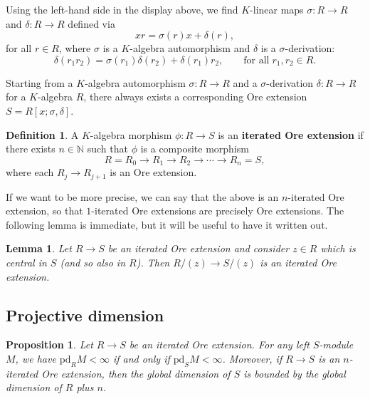 \documentclass{amsart}
\numberwithin{equation}{section}
\newtheorem{proposition}[subsubsection]{Proposition}
\newtheorem{lemma}[subsubsection]{Lemma}
\theoremstyle{definition}
\newtheorem{definition}[subsubsection]{Definition}
\theoremstyle{remark}
\newcommand{\mN}{\mathbb{N}}
\newcommand{\pd}{\mathrm{pd}}
\begin{document}
Using the left-hand side in the display above, we find $K$-linear maps $\sigma:R\to R$ and $\delta:R\to R$ defined via
\[xr=\sigma(r)x+\delta(r),\]
for all $r\in R$, where $\sigma$ is a $K$-algebra automorphism and $\delta$ is a $\sigma$-derivation:
\[\delta(r_1r_2)=\sigma(r_1)\delta(r_2)+\delta(r_1)r_2,\qquad\mbox{for all}\; r_1,r_2\in R.\]


Starting from a $K$-algebra automorphism $\sigma:R\to R$ and a $\sigma$-derivation $\delta:R\to R$ for a $K$-algebra $R$, there always exists a corresponding Ore extension $S=R[x;\sigma,\delta]$.



\begin{definition}
A $K$-algebra morphism $\phi:R\to S$ is an {\bf iterated Ore extension} if there exists $n\in\mN$ such that $\phi$ is a composite morphism
\[R=R_0\to R_1\to R_2\to\cdots\to R_n=S,\]
where each $R_j\to R_{j+1}$ is an Ore extension.
\end{definition}
If we want to be more precise, we can say that the above is an $n$-iterated Ore extension, so that $1$-iterated Ore extensions are precisely Ore extensions.
The following lemma is immediate, but it will be useful to have it written out.
\begin{lemma}\label{lem:Orequo}
Let $R\to S$ be an iterated Ore extension and consider $z\in R$ which is central in $S$ (and so also in $R$). Then $R/(z)\to S/(z)$ is an iterated Ore extension.
\end{lemma}

\subsection{Projective dimension}

\begin{proposition}\label{prop:iteratedOre}
Let $R\to S$ be an iterated Ore extension. For any left $S$-module $M$, we have
$\pd_RM<\infty$ if and only if $\pd_SM<\infty$. Moreover, if $R\to S$ is an $n$-iterated Ore extension, then the global dimension of $S$ is bounded by the global dimension of $R$ plus $n$.
\end{proposition}
\end{document}
